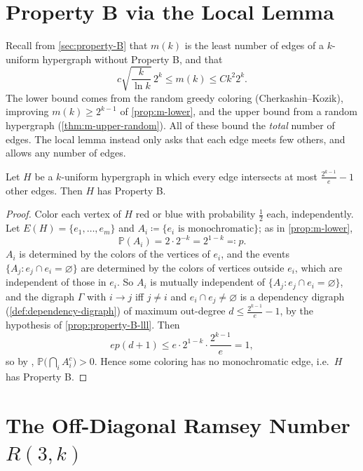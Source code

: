 \section{Property B via the Local Lemma}\label{sec:lll-property-B}

Recall from \autoref{sec:property-B} that \(m(k)\) is the least number of edges of a \(k\)-uniform hypergraph without Property B, and that
\[
    c \sqrt{\frac{k}{\ln k}} \, 2^{k} \le m(k) \le C k^{2} 2^{k} .
\]
The lower bound comes from the random greedy coloring (Cherkashin--Kozik), improving \(m(k) \ge 2^{k-1}\) of \autoref{prop:m-lower}, and the upper bound from a random hypergraph (\autoref{thm:m-upper-random}). All of these bound the \emph{total} number of edges. The local lemma instead only asks that each edge meets few others, and allows any number of edges.

\begin{proposition}\label{prop:property-B-lll}
    Let \(H\) be a \(k\)-uniform hypergraph in which every edge intersects at most \(\frac{2^{k-1}}{e} - 1\) other edges. Then \(H\) has Property B.
\end{proposition}

\begin{proof}
    Color each vertex of \(H\) red or blue with probability \(\frac{1}{2}\) each, independently. Let \(E(H) = \{e_{1}, \ldots, e_{m}\}\) and \(A_{i} \coloneqq \{ e_{i} \text{ is monochromatic} \}\); as in \autoref{prop:m-lower},
    \[
        \mathbb{P}(A_{i}) = 2 \cdot 2^{-k} = 2^{1-k} \eqqcolon p .
    \]
    \(A_{i}\) is determined by the colors of the vertices of \(e_{i}\), and the events \(\{ A_{j} : e_{j} \cap e_{i} = \varnothing \}\) are determined by the colors of vertices outside \(e_{i}\), which are independent of those in \(e_{i}\). So \(A_{i}\) is mutually independent of \(\{ A_{j} : e_{j} \cap e_{i} = \varnothing \}\), and the digraph \(\Gamma\) with \(i \to j\) iff \(j \ne i\) and \(e_{i} \cap e_{j} \ne \varnothing\) is a dependency digraph (\autoref{def:dependency-digraph}) of maximum out-degree \(d \le \frac{2^{k-1}}{e} - 1\), by the hypothesis of \autoref{prop:property-B-lll}. Then
    \[
        e p (d+1) \le e \cdot 2^{1-k} \cdot \frac{2^{k-1}}{e} = 1 ,
    \]
    so by , \(\mathbb{P}\bigl( \bigcap_{i} A_{i}^{c} \bigr) > 0\). Hence some coloring has no monochromatic edge, i.e.\ \(H\) has Property B.
\end{proof}

\section{The Off-Diagonal Ramsey Number \texorpdfstring{\(R(3,k)\)}{R(3,k)}}\label{sec:r3k}

